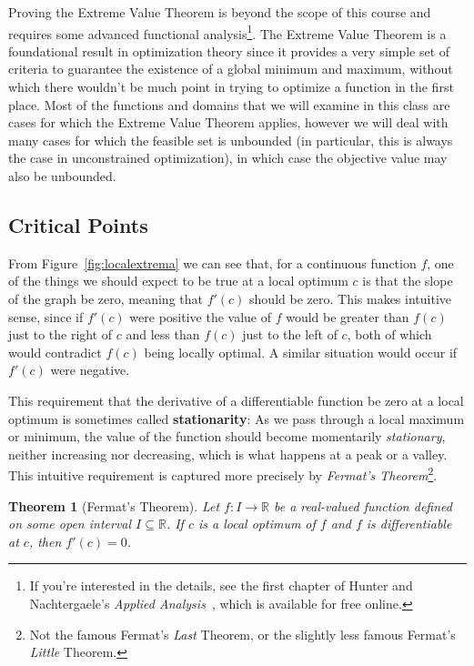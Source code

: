 \documentclass[11pt]{article}
\newtheorem{theorem}{Theorem}[section] %
\theoremstyle{definition} %
\begin{document}
Proving the Extreme Value Theorem is beyond the scope of this course and requires some advanced functional analysis\footnote{If you're interested in the details, see the first chapter of Hunter and Nachtergaele's \textit{Applied Analysis}~\cite{hunter}, which is available for free online.}. The Extreme Value Theorem is a foundational result in optimization theory since it provides a very simple set of criteria to guarantee the existence of a global minimum and maximum, without which there wouldn't be much point in trying to optimize a function in the first place. Most of the functions and domains that we will examine in this class are cases for which the Extreme Value Theorem applies, however we will deal with many cases for which the feasible set is unbounded (in particular, this is always the case in unconstrained optimization), in which case the objective value may also be unbounded.

\subsection{Critical Points}
\label{subsec:critical}

From Figure~\ref{fig:localextrema} we can see that, for a continuous function $f$, one of the things we should expect to be true at a local optimum $c$ is that the slope of the graph be zero, meaning that $f'(c)$ should be zero. This makes intuitive sense, since if $f'(c)$ were positive the value of $f$ would be greater than $f(c)$ just to the right of $c$ and less than $f(c)$ just to the left of $c$, both of which would contradict $f(c)$ being locally optimal. A similar situation would occur if $f'(c)$ were negative.

This requirement that the derivative of a differentiable function be zero at a local optimum is sometimes called \textbf{stationarity}: As we pass through a local maximum or minimum, the value of the function should become momentarily \textit{stationary}, neither increasing nor decreasing, which is what happens at a peak or a valley. This intuitive requirement is captured more precisely by \textit{Fermat's Theorem}\footnote{Not the famous Fermat's \textit{Last} Theorem, or the slightly less famous Fermat's \textit{Little} Theorem.}.

\begin{theorem}[Fermat's Theorem]
\label{thm:fermat}
	Let $f : I \to \mathbb{R}$ be a real-valued function defined on some open interval $I \subseteq \mathbb{R}$. If $c$ is a local optimum of $f$ and $f$ is differentiable at $c$, then $f'(c) = 0$.
\end{theorem}
\end{document}
